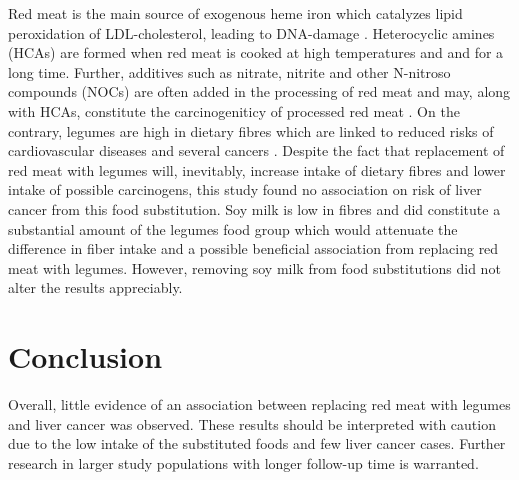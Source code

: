 \documentclass[nutrients,article,submit,moreauthors,pdftex]{Definitions/mdpi}
\begin{document}
Red meat is the main source of exogenous heme iron which catalyzes lipid
peroxidation of LDL-cholesterol, leading to DNA-damage \citep{Jeney2002}.
Heterocyclic amines (HCAs) are formed when red meat is cooked at high
temperatures and and for a long time. Further, additives such as
nitrate, nitrite and other N-nitroso compounds (NOCs) are often added in
the processing of red meat and may, along with HCAs, constitute the
carcinogeniticy of processed red meat \citep{Felton1997, Li2022, Seyyedsalehi2023}. On the contrary, legumes are high in dietary fibres
which are linked to reduced risks of cardiovascular diseases and several
cancers \citep{Dahm2024, Hu2023}. Despite the fact that replacement of red
meat with legumes will, inevitably, increase intake of dietary fibres
and lower intake of possible carcinogens, this study found no
association on risk of liver cancer from this food substitution. Soy
milk is low in fibres and did constitute a substantial amount of the
legumes food group which would attenuate the difference in fiber intake
and a possible beneficial association from replacing red meat with
legumes. However, removing soy milk from food substitutions did not
alter the results appreciably.

\hypertarget{sec5}{%
\section{Conclusion}\label{sec5}}

Overall, little evidence of an association between replacing red meat
with legumes and liver cancer was observed. These results should be
interpreted with caution due to the low intake of the substituted foods
and few liver cancer cases. Further research in larger study populations
with longer follow-up time is warranted.


\vspace{6pt}



\end{document}
